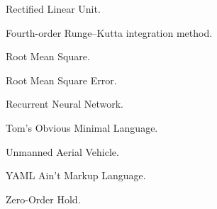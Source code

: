 \begin{description}[leftmargin=2.5cm, labelindent=0cm]
  \item[ReLU] Rectified Linear Unit.
  \item[RK4] Fourth-order Runge--Kutta integration method.
  \item[RMS] Root Mean Square.
  \item[RMSE] Root Mean Square Error.
  \item[RNN] Recurrent Neural Network.
  \item[TOML] Tom's Obvious Minimal Language.
  \item[UAV] Unmanned Aerial Vehicle.
  \item[YAML] YAML Ain't Markup Language.
  \item[ZOH] Zero-Order Hold.
\end{description}

\clearpage
\endgroup
\pagestyle{fancy}
